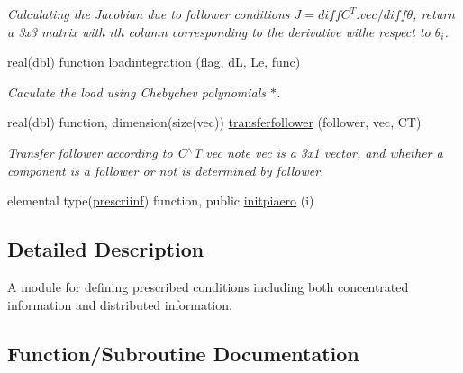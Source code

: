 \begin{DoxyCompactItemize}
\begin{DoxyCompactList}\small\item\em Calculating the Jacobian due to follower conditions $ J=diff{C^T.vec}/diff\theta $, return a 3x3 matrix with ith column corresponding to the derivative withe respect to $ \theta_i $. \end{DoxyCompactList}\item 
real(dbl) function \hyperlink{namespaceprescribedcondition_a55980eb8579eed448879c6118e6218c7}{loadintegration} (flag, dL, Le, func)
\begin{DoxyCompactList}\small\item\em Caculate the load using Chebychev polynomials $\ast$. \end{DoxyCompactList}\item 
real(dbl) function, dimension(size(vec)) \hyperlink{namespaceprescribedcondition_aa60c7ca2dee406dc7cda895535b36927}{transferfollower} (follower, vec, CT)
\begin{DoxyCompactList}\small\item\em Transfer follower according to C$^\wedge$T.vec note vec is a 3x1 vector, and whether a component is a follower or not is determined by follower. \end{DoxyCompactList}\item 
elemental type(\hyperlink{structprescribedcondition_1_1prescriinf}{prescriinf}) function, public \hyperlink{namespaceprescribedcondition_a29eb27f666876bff8a4577eb21d5b2d1}{initpiaero} (i)
\end{DoxyCompactItemize}


\subsection{Detailed Description}
A module for defining prescribed conditions including both concentrated information and distributed information. 

\subsection{Function/\+Subroutine Documentation}
\mbox{\label{namespaceprescribedcondition_acb722f1fdcfebc72bc33fb3162d9db6d}} 
